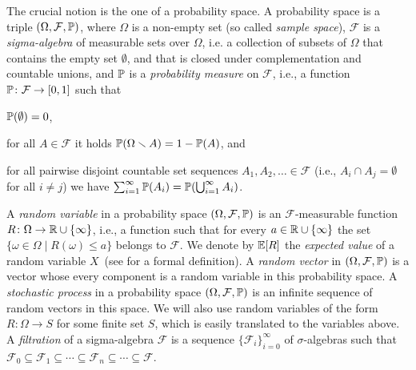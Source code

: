 \smallskip{}
The crucial notion is the one of a probability space. A probability space is a triple
$(\Omega,\mathcal{F},\mathbb{P})$, where $\Omega$ is a non-empty set (so called
\emph{sample space}), $\mathcal{F}$ is a \emph{sigma-algebra} of measurable 
sets over $\Omega$,
i.e. a collection of subsets of $\Omega$ that contains the empty set
$\emptyset$, and that is closed under complementation and countable unions, and
$\mathbb{P}$ is a \emph{probability measure} on $\mathcal{F}$, i.e., a function
$\mathbb{P}\colon \mathcal{F}\rightarrow[0,1]$ such that
\begin{compactitem}
\item $\mathbb{P}(\emptyset)=0$,
\item for all $A\in \mathcal{F}$ it holds $\mathbb{P}(\Omega\smallsetminus
A)=1-\mathbb{P}(A)$, and
\item for all pairwise disjoint countable set sequences $A_1,A_2,\dots \in
\mathcal{F}$ (i.e., $A_i \cap A_j = \emptyset$ for all $i\neq j$)
we have $\sum_{i=1}^{\infty}\mathbb{P}(A_i)=\mathbb{P}(\bigcup_{i=1}^{\infty} A_i)$.
\end{compactitem}

A \emph{random variable} in a probability space $(\Omega,\mathcal{F},\mathbb{P})$ is
an $\mathcal{F}$-measurable function $R\colon \Omega \rightarrow \mathbb{R} \cup
\{\infty\}$, i.e.,
a function such that for every $a\in \mathbb{R} \cup \{ \infty\}$ the set
$\{\omega\in \Omega\mid R(\omega)\leq a\}$ belongs to $\mathcal{F}$.
We denote by $\mathbb{E}[R]$ the \emph{expected value} of a random variable $X$~(see \cite[Chapter 5]{Billingsley:book}
for a formal definition). 
A \emph{random vector} in $(\Omega,\mathcal{F},\mathbb{P})$ is a vector whose every component is a random 
variable in this probability space. A \emph{stochastic process} in a 
probability space $(\Omega,\mathcal{F},\mathbb{P})$ is an infinite sequence of 
random vectors in this space.
We will also use random variables of the form $R\colon\Omega \rightarrow S$ for some finite 
set $S$, which is easily translated to the variables above.
A \emph{filtration} of a sigma-algebra $\mathcal{F}$ is a
sequence $\{\mathcal{F}_i \}_{i=0}^{\infty}$ of $\sigma$-algebras 
such that $\mathcal{F}_0 \subseteq \mathcal{F}_1 \subseteq \cdots \subseteq
\mathcal{F}_n \subseteq \cdots \subseteq \mathcal{F}$.

